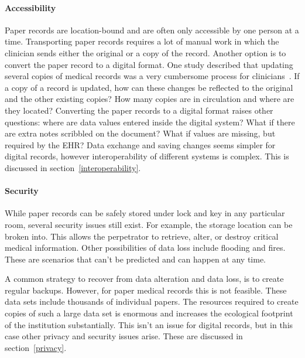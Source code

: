     \paragraph{Accessibility} Paper records are location-bound and are often only accessible by one person at a time. Transporting paper records requires a lot of manual work in which the clinician sends either the original or a copy of the record. Another option is to convert the paper record to a digital format. One study described that updating several copies of medical records was a very cumbersome process for clinicians~\cite{Tange1999}. If a copy of a record is updated, how can these changes be reflected to the original and the other existing copies? How many copies are in circulation and where are they located? Converting the paper records to a digital format raises other questions: where are data values entered inside the digital system? What if there are extra notes scribbled on the document? What if values are missing, but required by the EHR\@? Data exchange and saving changes seems simpler for digital records, however interoperability of different systems is complex. This is discussed in section~\ref{interoperability}.

    \paragraph{Security} While paper records can be safely stored under lock and key in any particular room, several security issues still exist. For example, the storage location can be broken into. This allows the perpetrator to retrieve, alter, or destroy critical medical information. Other possibilities of data loss include flooding and fires. These are scenarios that can't be predicted and can happen at any time. 

    A common strategy to recover from data alteration and data loss, is to create regular backups. However, for paper medical records this is not feasible. These data sets include thousands of individual papers. The resources required to create copies of such a large data set is enormous and increases the ecological footprint of the institution substantially. This isn't an issue for digital records, but in this case other privacy and security issues arise. These are discussed in section~\ref{privacy}.\bigskip


